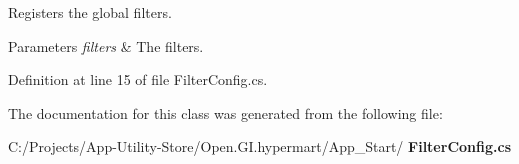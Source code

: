 Registers the global filters. 


\begin{DoxyParams}{Parameters}
{\em filters} & The filters.\\
\hline
\end{DoxyParams}


Definition at line 15 of file Filter\+Config.\+cs.



The documentation for this class was generated from the following file\+:\begin{DoxyCompactItemize}
\item 
C\+:/\+Projects/\+App-\/\+Utility-\/\+Store/\+Open.\+G\+I.\+hypermart/\+App\+\_\+\+Start/\textbf{ Filter\+Config.\+cs}\end{DoxyCompactItemize}
